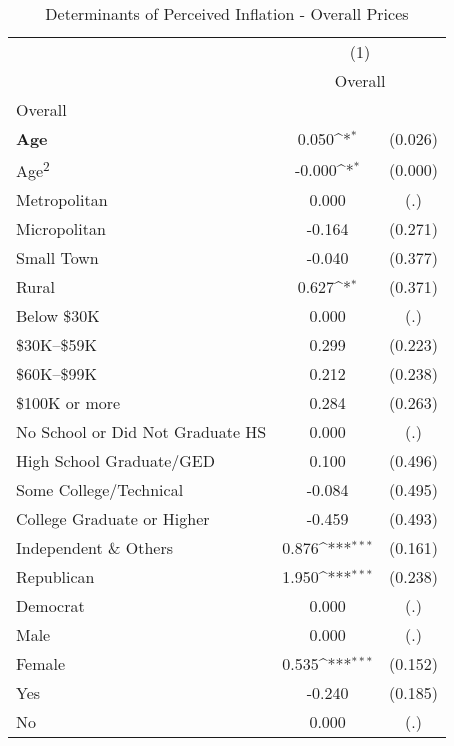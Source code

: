 \begin{table}[htbp]\centering
\def\sym#1{\ifmmode^{#1}\else\(^{#1}\)\fi}
\caption{Determinants of Perceived Inflation - Overall Prices}
\begin{tabular}{l*{1}{cc}}
\hline\hline
                    &\multicolumn{2}{c}{(1)}           \\
                    &\multicolumn{2}{c}{Overall}       \\
\hline
Overall             &                     &            \\
\textbf{Age}        &       0.050\sym{*}  &     (0.026)\\
Age\textsuperscript{2}&      -0.000\sym{*}  &     (0.000)\\
Metropolitan        &       0.000         &         (.)\\
Micropolitan        &      -0.164         &     (0.271)\\
Small Town          &      -0.040         &     (0.377)\\
Rural               &       0.627\sym{*}  &     (0.371)\\
Below \$30K         &       0.000         &         (.)\\
\$30K--\$59K        &       0.299         &     (0.223)\\
\$60K--\$99K        &       0.212         &     (0.238)\\
\$100K or more      &       0.284         &     (0.263)\\
No School or Did Not Graduate HS&       0.000         &         (.)\\
High School Graduate/GED&       0.100         &     (0.496)\\
Some College/Technical&      -0.084         &     (0.495)\\
College Graduate or Higher&      -0.459         &     (0.493)\\
Independent \& Others&       0.876\sym{***}&     (0.161)\\
Republican          &       1.950\sym{***}&     (0.238)\\
Democrat            &       0.000         &         (.)\\
Male                &       0.000         &         (.)\\
Female              &       0.535\sym{***}&     (0.152)\\
Yes                 &      -0.240         &     (0.185)\\
No                  &       0.000         &         (.)\\

\end{tabular}
\end{table}
